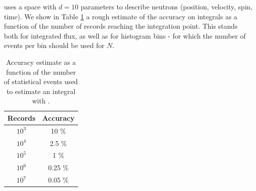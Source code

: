 \MCS uses a space with $d=10$ parameters to describe neutrons (position, velocity, spin, time). We show in Table \ref{t:mc_accuracy} a rough estimate of the accuracy on integrals as a function of the number of records reaching the integration point. This stands both for integrated flux, as well as for histogram bins - for which the number of events per bin should be used for $N$.

\begin{table}
  \begin{center}
  {\let\my=\\
    \begin{tabular}{|c|c|}
    \hline
    Records       & Accuracy \\
    \hline
    $10^3$ & 10 \% \\
    $10^4$ & 2.5 \% \\
    $10^5$ & 1 \% \\
    $10^6$ & 0.25 \% \\
    $10^7$ & 0.05 \% \\
    \hline
    \end{tabular}
    \caption{Accuracy estimate as a function of the number of statistical events used to estimate an integral with \MCS.}
    \label{t:mc_accuracy}
  }
  \end{center}
\end{table}

